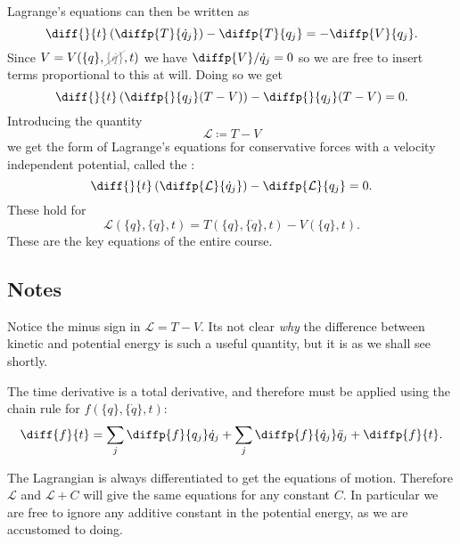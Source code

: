 \documentclass[fleqn]{NotesClass}
\newcommand*{\nodependence}[1]{\textcolor{gray}{\cancel{#1}}}
\newcommand*{\lagrangian}{\mathcal{L}}
\begin{document}
    Lagrange's equations can then be written as
    \begin{equation}
        \diff{}{t}\left( \diffp{T}{\dot{q}_j} \right) - \diffp{T}{q_j} = -\diffp{V}{q_j}.
    \end{equation}
    Since \(V = V(\{q\}, \nodependence{\{\dot{q}\}}, t)\) we have \(\diffp{V}/{\dot{q}_j} = 0\) so we are free to insert terms proportional to this at will.
    Doing so we get
    \begin{equation}
        \diff{}{t}\left( \diffp{}{q_j}(T - V) \right) - \diffp{}{q_j}(T - V) = 0.
    \end{equation}
    Introducing the quantity
    \begin{equation}
        \lagrangian \coloneqq T - V
    \end{equation}
    we get the form of Lagrange's equations for conservative forces with a velocity independent potential, called the :
    \begin{equation}
        \diff{}{t}\left( \diffp{\lagrangian}{\dot{q}_j} \right) - \diffp{\lagrangian}{q_j} = 0.
    \end{equation}
    These hold for
    \begin{equation}
        \lagrangian(\{q\}, \{\dot{q}\}, t) = T(\{q\}, \{\dot{q}\}, t) - V(\{q\}, t).
    \end{equation}
    These are the key equations of the entire course.
    
    \subsection{Notes}
    Notice the minus sign in \(\lagrangian = T - V\).
    Its not clear \emph{why} the difference between kinetic and potential energy is such a useful quantity, but it is as we shall see shortly.
    
    The time derivative is a total derivative, and therefore must be applied using the chain rule for \(f(\{q\}, \{\dot{q}\}, t)\):
    \begin{equation}
        \diff{f}{t} = \sum_j \diffp{f}{q_j}\dot{q}_j + \sum_j \diffp{f}{\dot{q}_j} \ddot{q}_j + \diffp{f}{t}.
    \end{equation}
    
    The Lagrangian is always differentiated to get the equations of motion.
    Therefore \(\lagrangian\) and \(\lagrangian + C\) will give the same equations for any constant \(C\).
    In particular we are free to ignore any additive constant in the potential energy, as we are accustomed to doing.
    
\end{document}

